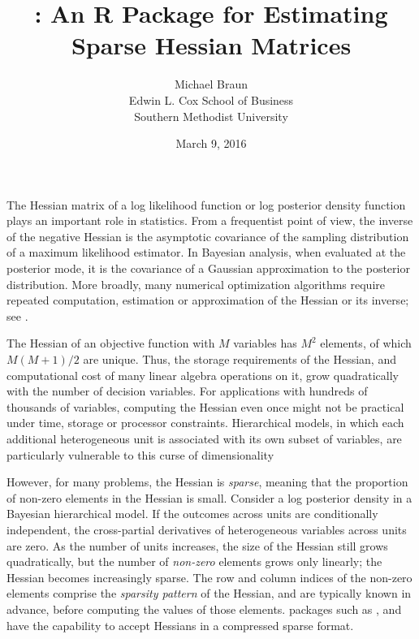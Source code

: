 \documentclass[article]{jss}\usepackage[]{graphicx}\usepackage[]{color}
\author{Michael Braun\\Edwin L. Cox School of Business\\Southern Methodist University}
\title{\pkg{sparseHessianFD}: An R Package for Estimating Sparse Hessian Matrices}
\date{March 9, 2016}
\begin{document}
The Hessian matrix of a log likelihood function or log posterior
density function plays
an important role in statistics.  From a frequentist point of view,
the inverse of the negative Hessian is the asymptotic covariance of the sampling distribution of a maximum
likelihood estimator.  In Bayesian analysis, when evaluated at the
posterior mode, it is the covariance of a Gaussian approximation to
the posterior distribution.  More broadly, many numerical optimization
algorithms require repeated computation, estimation or approximation
of the Hessian or its inverse; see \citet{NocedalWright2006}.

The Hessian of an objective function with $M$ variables has $M^2$
elements, of which $M(M+1)/2$ are unique.  Thus, the storage
requirements of the Hessian, and computational cost of many linear
algebra operations on it, grow quadratically with the number of
decision variables.   For
applications with hundreds of thousands of variables, computing the
Hessian even once might not be practical under time, storage or processor constraints.  Hierarchical models, in
which each additional heterogeneous unit is associated with its own subset of
variables, are particularly vulnerable to this curse of dimensionality

However, for many problems, the Hessian is
\emph{sparse}, meaning that the proportion of non-zero elements in the
Hessian is small.  Consider a log
posterior density in a Bayesian hierarchical
model.  If the outcomes across units are conditionally
independent, the cross-partial derivatives of heterogeneous variables
across units are zero.  As the number of units
increases, the size of the Hessian still grows quadratically, but the number
of \emph{non-zero} elements grows only linearly; the Hessian
becomes increasingly sparse.  The row and column indices of the
non-zero elements comprise the \emph{sparsity pattern} of the Hessian,
and are typically known in advance, before computing the values of
those elements.   packages such as 
\citep{R_trustOptim},  \citep{R_sparseMVN} and
 \citep{R_ipoptr} have the capability to accept Hessians
in a compressed sparse format.
\end{document}
